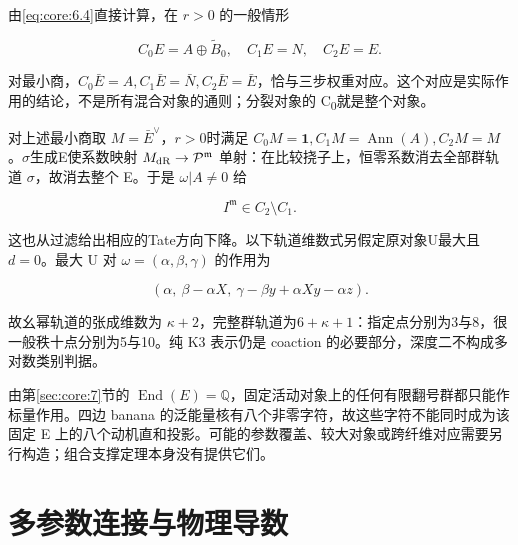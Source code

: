 \documentclass[11pt,a4paper,oneside]{ctexart}
\theoremstyle{cnplain}
\theoremstyle{definition}
\theoremstyle{remark}
\numberwithin{equation}{section}
\begin{document}
由\eqref{eq:core:6.4}直接计算，在 \(r>0\) 的一般情形

\begin{equation}
C_0E=A\oplus\widetilde B_0,\quad C_1E=N,\quad C_2E=E.
                                                               \label{eq:coaction:9.3}
\end{equation}

对最小商，\(C_0\bar E=A,C_1\bar E=\bar N,C_2\bar E=\bar E\)，恰与三步权重对应。这个对应是实际作用的结论，不是所有混合对象的通则；分裂对象的 C\textsubscript{0}就是整个对象。

对上述最小商取 \(M=\bar E^\vee\)，\(r>0\)时满足 \(C_0M=\mathbf1,C_1M=\operatorname{Ann}(A),C_2M=M\)。\(\sigma \)生成E使系数映射 \(M_{\rm dR}\to\mathcal P^{\mathfrak m}\) 单射：在比较挠子上，恒零系数消去全部群轨道 \(\sigma \)，故消去整个 E。于是 \(\omega|A\ne0\) 给

\begin{equation}
I^{\mathfrak m}\in C_2\setminus C_1. 
                                                               \label{eq:coaction:9.4}
\end{equation}

这也从过滤给出相应的Tate方向下降。以下轨道维数式另假定原对象U最大且\(d=0\)。最大 U 对 \(\omega=(\alpha,\beta,\gamma)\) 的作用为

\begin{equation}
(\alpha,\ \beta-\alpha X,\ \gamma-\beta y+\alpha Xy-\alpha z).
\end{equation}

故幺幂轨道的张成维数为 \(\kappa +2\)，完整群轨道为\(6+\kappa +1\)：指定点分别为3与8，很一般秩十点分别为5与10。纯 K3 表示仍是 coaction 的必要部分，深度二不构成多对数类别判据。

由第\ref{sec:core:7}节的 \(\operatorname{End}(E)=\mathbb Q\)，固定活动对象上的任何有限翻号群都只能作标量作用。四边 banana 的泛能量核有八个非零字符，故这些字符不能同时成为该固定 E 上的八个动机直和投影。可能的参数覆盖、较大对象或跨纤维对应需要另行构造；组合支撑定理本身没有提供它们。



\endgroup

\section{多参数连接与物理导数}\label{ch:connection}\label{ch:deriv}

\begingroup
\end{document}
